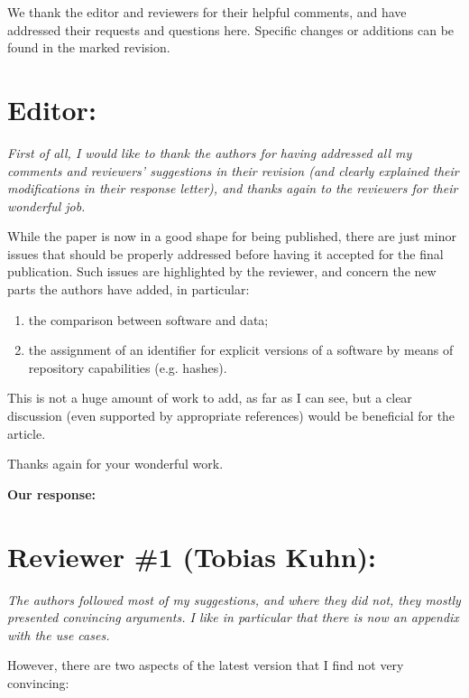 \documentclass{article}
\newcommand{\hly}[1]{{\sethlcolor{yellow}\hl{#1}}}
\newcommand{\hlb}[1]{{\sethlcolor{SkyBlue}\hl{#1}}}
\newcommand{\hlg}[1]{{\sethlcolor{green}\hl{#1}}}
\begin{document}
We thank the editor and reviewers for their helpful comments, and have addressed their requests and questions here.
Specific changes or additions can be found in the marked revision.


\section*{Editor:}

{\itshape
First of all, I would like to thank the authors for having addressed all my
comments and reviewers' suggestions in their revision (and clearly explained
their modifications in their response letter), and thanks again to the
reviewers for their wonderful job.

While the paper is now in a good shape for being published, there are just
minor issues that should be properly addressed before having it accepted
for the final publication. Such issues are highlighted by the reviewer, and
concern the new parts the authors have added, in particular:

\begin{enumerate}
\item the comparison between software and data;
\item the assignment of an identifier for explicit versions of a software by
means of repository capabilities (e.g. hashes).
\end{enumerate}

This is not a huge amount of work to add, as far as I can see, but a clear
discussion (even supported by appropriate references) would be beneficial
for the article.

Thanks again for your wonderful work.
}

\textbf{Our response:}


\section*{Reviewer \#1 (Tobias Kuhn):}

{\itshape
The authors followed most of my suggestions, and where they did not, they
mostly presented convincing arguments. I like in particular that there is
now an appendix with the use cases.

However, there are two aspects of the latest version that I find not very
convincing:
}
\end{document}
